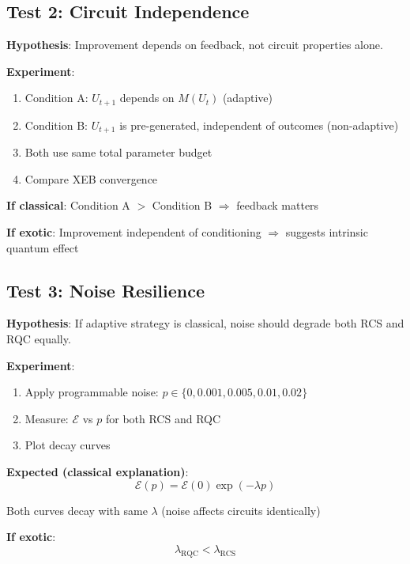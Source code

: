 \documentclass[twocolumn]{article}
\begin{document}
\subsection{Test 2: Circuit Independence}

\textbf{Hypothesis}: Improvement depends on feedback, not circuit properties alone.

\textbf{Experiment}:
\begin{enumerate}
\item Condition A: $U_{t+1}$ depends on $M(U_t)$ (adaptive)
\item Condition B: $U_{t+1}$ is pre-generated, independent of outcomes (non-adaptive)
\item Both use same total parameter budget
\item Compare XEB convergence
\end{enumerate}

\textbf{If classical}: Condition A $>$ Condition B $\Rightarrow$ feedback matters

\textbf{If exotic}: Improvement independent of conditioning $\Rightarrow$ suggests intrinsic quantum effect

\subsection{Test 3: Noise Resilience}

\textbf{Hypothesis}: If adaptive strategy is classical, noise should degrade both RCS and RQC equally.

\textbf{Experiment}:
\begin{enumerate}
\item Apply programmable noise: $p \in \{0, 0.001, 0.005, 0.01, 0.02\}$
\item Measure: $\mathcal{E}$ vs $p$ for both RCS and RQC
\item Plot decay curves
\end{enumerate}

\textbf{Expected (classical explanation)}:
\begin{equation}
\mathcal{E}(p) = \mathcal{E}(0) \exp(-\lambda p)
\end{equation}

Both curves decay with same $\lambda$ (noise affects circuits identically)

\textbf{If exotic}:
\begin{equation}
\lambda_{\text{RQC}} < \lambda_{\text{RCS}}
\end{equation}
\end{document}
